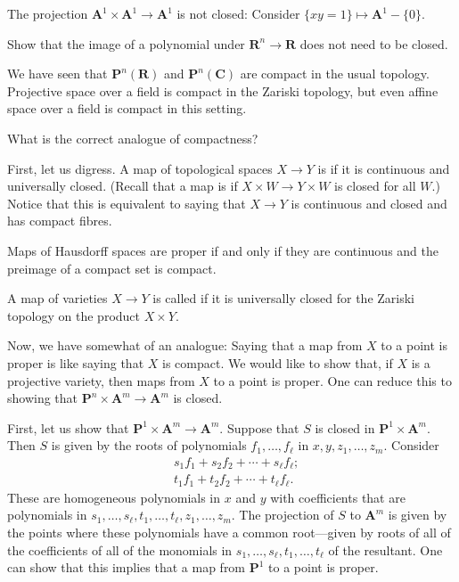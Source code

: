 \documentclass [11 pt, oneside, margin = 1 in] {article}
\begin{document}
\begin{example}[ ]\label{}\text{}
The projection $\mathbf{A}^1\times \mathbf{A}^1 \longrightarrow \mathbf{A}^1$ is not closed: Consider $\{xy=1\}\longmapsto \mathbf{A}^1-\{0\}$.
\end{example}

\begin{exercise}\label{}\text{}
Show that the image of a polynomial under $\mathbf{R}^n\longrightarrow \mathbf{R}$ does not need to be closed.
\end{exercise}

We have seen that $\mathbf{P}^n(\mathbf{R})$ and $\mathbf{P}^n(\mathbf{C})$ are compact in the usual topology. Projective space over a field is compact in the Zariski topology, but even affine space over a field is compact in this setting.

\begin{problem}
	What is the correct analogue of compactness?
\end{problem}

First, let us digress. A map of topological spaces $X\longrightarrow Y$ is  if it is continuous and universally closed. (Recall that a map is  if $X\times W\longrightarrow Y\times W$ is closed for all $W$.) Notice that this is equivalent to saying that $X\longrightarrow Y$ is continuous and closed and has compact fibres.

Maps of Hausdorff spaces are proper if and only if they are continuous and the preimage of a compact set is compact.

A map of varieties $X\longrightarrow Y$ is called  if it is universally closed for the Zariski topology on the product $X\times Y$. 

Now, we have somewhat of an analogue: Saying that a map from $X$ to a point is proper is like saying that $X$ is compact. We would like to show that, if $X$ is a projective variety, then maps from $X$ to a point is proper. One can reduce this to showing that $\mathbf{P}^n\times \mathbf{A}^m\longrightarrow \mathbf{A}^m$ is closed.

First, let us show that $\mathbf{P}^1\times \mathbf{A}^m\longrightarrow \mathbf{A}^m$. Suppose that $S$ is closed in $\mathbf{P}^1\times \mathbf{A}^m$. Then $S$ is given by the roots of polynomials $f_1,\hdots, f_\ell$ in $x,y, z_1,\hdots,z_m$. Consider 
\begin{align*}
	&s_1f_1+s_2f_2+\cdots+s_\ell f_\ell;\\
	&t_1f_1+t_2f_2+\cdots+t_\ell f_\ell.
\end{align*}
These are homogeneous polynomials in $x$ and $y$ with coefficients that are polynomials in $s_1,\hdots,s_\ell,t_1,\hdots, t_\ell,z_1,\hdots, z_m$. The projection of $S$ to $\mathbf{A}^m$ is given by the points where these polynomials have a common root---given by roots of all of the coefficients of all of the monomials in $s_1,\hdots,s_\ell,t_1,\hdots, t_\ell$ of the resultant. One can show that this implies that a map from $\mathbf{P}^1$ to a point is proper.
\end{document}
